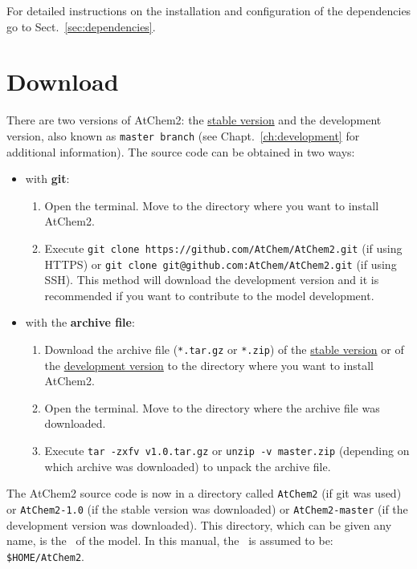 For detailed instructions on the installation and configuration of the
dependencies go to Sect.~\ref{sec:dependencies}.

\section{Download} \label{sec:download}

There are two versions of AtChem2: the
\href{https://github.com/AtChem/AtChem2/releases}{stable version} and
the development version, also known as \texttt{master\ branch} (see
Chapt.~\ref{ch:development} for additional information). The source
code can be obtained in two ways:

\begin{itemize}
\item with \textbf{git}:
  \begin{enumerate}
  \item Open the terminal. Move to the directory where you want to
    install AtChem2.
  \item Execute \verb|git clone https://github.com/AtChem/AtChem2.git|
    (if using HTTPS) or \verb|git clone git@github.com:AtChem/AtChem2.git|
    (if using SSH). This method will download the development version
    and it is recommended if you want to contribute to the model
    development.
  \end{enumerate}
\item with the \textbf{archive file}:
  \begin{enumerate}
  \item Download the archive file (\texttt{*.tar.gz} or \texttt{*.zip}) of the
    \href{https://github.com/AtChem/AtChem2/releases}{stable version} or of the
    \href{https://github.com/AtChem/AtChem2/archive/master.zip}{development version}
    to the directory where you want to install AtChem2.
  \item Open the terminal. Move to the directory where the archive
    file was downloaded.
  \item Execute \verb|tar -zxfv v1.0.tar.gz| or
    \verb|unzip -v master.zip| (depending on which archive was
    downloaded) to unpack the archive file.
  \end{enumerate}
\end{itemize}

The AtChem2 source code is now in a directory called \texttt{AtChem2}
(if git was used) or \texttt{AtChem2-1.0}  
(if the stable version was
downloaded) or \texttt{AtChem2-master} (if the development version was
downloaded). This directory, which can be given any name, is the
\maindir\ of the model. In this manual, the \maindir\ is assumed to
be: \texttt{\$HOME/AtChem2}.

